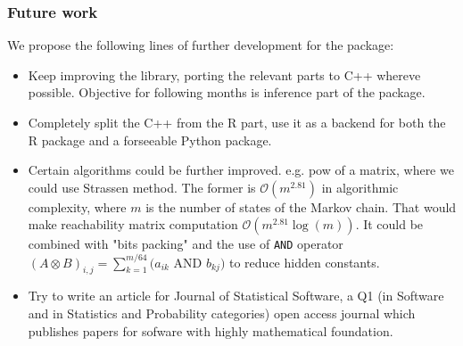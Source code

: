 \begin{frame}\frametitle{Future work}
 \vspace{2em}\fontsize{10pt}{0}\selectfont
 We propose the following lines of further development for the package:
 \begin{itemize}
 \item Keep improving the library, porting the relevant parts to C++ whereve
 possible. Objective for following months is inference part of the package.
 \item Completely split the C++ from the R part, use it as a backend for both the R 
 package and a forseeable Python package.
 \item Certain algorithms could be further improved. e.g. pow of a matrix, where we 
 could use Strassen method. The former is $\mathcal{O}(m^{2.81})$ in algorithmic 
 complexity, where $m$ is the number of states of the Markov chain. That would make 
 reachability matrix computation $\mathcal{O}(m^{2.81} \log(m))$. It could be combined 
 with "bits packing" and the use of \texttt{AND} operator
 $(A \otimes B)_{i,j} = \sum_{k = 1}^{m/64} \bigg(a_{ik} \textrm{ AND } b_{kj}\bigg)$
 to reduce hidden constants.
 \item Try to write an article for Journal of Statistical Software, a Q1 (in Software 
 and in Statistics and Probability categories) open access journal which publishes papers
 for sofware with highly mathematical foundation.
 \end{itemize}
\end{frame}
